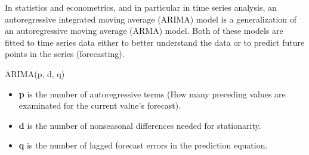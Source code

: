 In statistics and econometrics, and in particular in time series analysis, an autoregressive integrated moving average (ARIMA) model is a generalization of an autoregressive moving average (ARMA) model. Both of these models are fitted to time series data either to better understand the data or to predict future points in the series (forecasting).

ARIMA(p, d, q)
\begin{itemize}
\item \textbf{p} is the number of autoregressive terms (How many preceding values are examinated for the current value’s forecast).

\item \textbf{d} is the number of nonseasonal differences needed for stationarity.

\item \textbf{q} is the number of lagged forecast errors in the prediction equation. 
\end{itemize}

